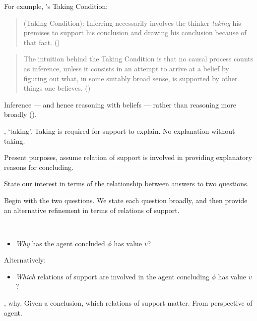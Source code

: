 \begin{note}
  For example, \citeauthor{Boghossian:2014aa}'s Taking Condition:

  \begin{quote}
    (Taking Condition):
    Inferring necessarily involves the thinker \emph{taking} his premises to support his conclusion and drawing his conclusion because of that fact.%
    \mbox{}\hfill\mbox{(\Citeyear[5]{Boghossian:2014aa})}
  \end{quote}

  \begin{quote}
    The intuition behind the Taking Condition is that no causal process counts as inference, unless it consists in an attempt to arrive at a belief by figuring out what, in some suitably broad sense, is supported by other things one believes.%
    \mbox{}\hfill\mbox{(\Citeyear[5]{Boghossian:2014aa})}
  \end{quote}

  Inference --- and hence reasoning with beliefs --- rather than reasoning more broadly (\Citeyear[cf][2]{Boghossian:2014aa}).

  \citeauthor{Boghossian:2014aa}, `taking'.
  Taking is required for support to explain.
  No explanation without taking.
\end{note}

\begin{note}
  Present purposes, assume relation of support is involved in providing explanatory reasons for concluding.
\end{note}

\begin{note}
  State our interest in terms of the relationship between answers to two questions.

  Begin with the two questions.
  We state each question broadly, and then provide an alternative refinement in terms of relations of support.
\end{note}

\begin{note}
  \begin{question}[\qWhy{}?]
    \label{q:why}
    \mbox{ }
    \vspace{-\baselineskip}
    \begin{itemize}
    \item
      \emph{Why} has the agent concluded \(\phi\) has value \(v\)?
    \end{itemize}

    Alternatively:

    \begin{itemize}
    \item
      \emph{Which} relations of support are involved in the agent concluding \(\phi\) has value \(v\)?
    \end{itemize}
    \vspace{-\baselineskip}
    \vspace{-\baselineskip}
  \end{question}

  , why.
  Given a conclusion, which relations of support matter.
  From perspective of agent.
\end{note}

